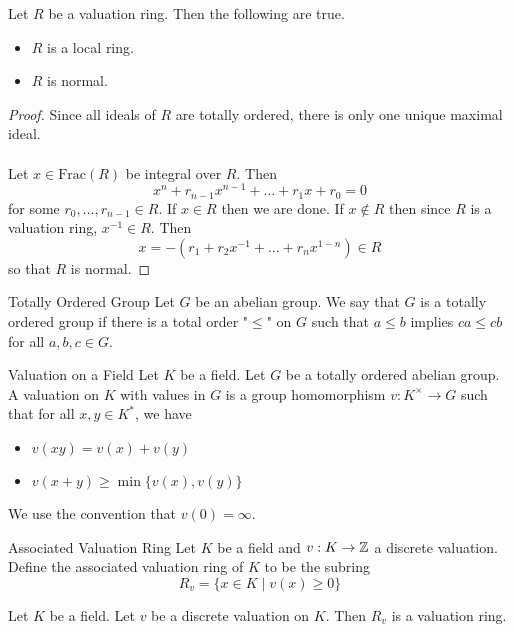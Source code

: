 \documentclass[a4paper]{article}
\begin{document}
\begin{lmm}{}{} Let $R$ be a valuation ring. Then the following are true. 
\begin{itemize}
\item $R$ is a local ring. 
\item $R$ is normal. 
\end{itemize} \tcbline
\begin{proof}
Since all ideals of $R$ are totally ordered, there is only one unique maximal ideal. \\~\\

Let $x\in\text{Frac}(R)$ be integral over $R$. Then $$x^n+r_{n-1}x^{n-1}+\dots+r_1x+r_0=0$$ for some $r_0,\dots,r_{n-1}\in R$. If $x\in R$ then we are done. If $x\notin R$ then since $R$ is a valuation ring, $x^{-1}\in R$. Then $$x=-(r_1+r_2x^{-1}+\dots+r_nx^{1-n})\in R$$ so that $R$ is normal. 
\end{proof}
\end{lmm}

\begin{defn}{Totally Ordered Group}{} Let $G$ be an abelian group. We say that $G$ is a totally ordered group if there is a total order "$\leq$" on $G$ such that $a\leq b$ implies $ca\leq cb$ for all $a,b,c\in G$. 
\end{defn}

\begin{defn}{Valuation on a Field}{} Let $K$ be a field. Let $G$ be a totally ordered abelian group. A valuation on $K$ with values in $G$ is a group homomorphism $v:K^\times\to G$ such that for all $x,y\in K^\ast$, we have 
\begin{itemize}
\item $v(xy)=v(x)+v(y)$
\item $v(x+y)\geq\min\{v(x),v(y)\}$
\end{itemize}
We use the convention that $v(0)=\infty$. 
\end{defn}

\begin{defn}{Associated Valuation Ring}{} Let $K$ be a field and $v:K\to\mathbb{Z}$ a discrete valuation. Define the associated valuation ring of $K$ to be the subring $$R_v=\{x\in K\;|\;v(x)\geq 0\}$$
\end{defn}

\begin{lmm}{}{} Let $K$ be a field. Let $v$ be a discrete valuation on $K$. Then $R_v$ is a valuation ring. 
\end{lmm}
\end{document}
